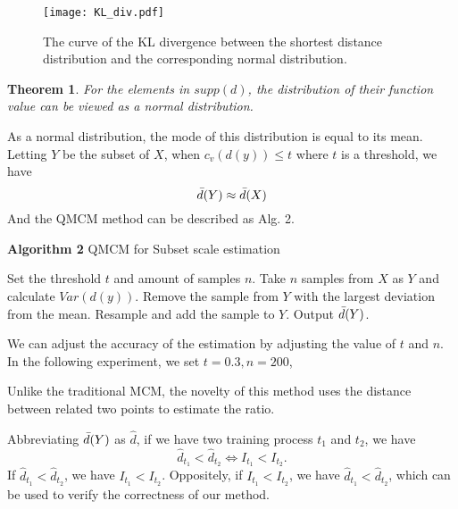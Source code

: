\documentclass[letterpaper]{article} %
\newtheorem{theorem}{Theorem}
\begin{document}
\begin{figure}[p]
    \centering
    \texttt{[image: KL\_div.pdf]}
    \caption{The curve of the KL divergence between the shortest distance distribution and the corresponding normal distribution.}
    \label{KL_curve}
\end{figure}

\begin{theorem}
    For the elements in $supp(d)$, the distribution of their function value can be viewed as a normal distribution.
    \label{support_distance_theorom}
\end{theorem}

As a normal distribution, the mode of this distribution is equal to its mean. Letting $Y$ be the subset of $X$, when $c_v(d(y)) \leq t$ where $t$ is a threshold, we have
\begin{equation*}
    \Bar{d}(Y) \approx \Bar{d}(X)
\end{equation*}
And the QMCM method can be described as Alg. 2.

\begin{algorithm}[htbp]
\caption*{\textbf{Algorithm 2} QMCM for Subset scale estimation}
\begin{algorithmic}[1]
    \STATE Set the threshold $t$ and amount of samples $n$.
    \STATE Take $n$ samples from $X$ as $Y$ and calculate $Var(d(y))$.
    \STATE Remove the sample from $Y$ with the largest deviation from the mean.
    \STATE Resample and add the sample to $Y$.
    \ENDWHILE
    \STATE Output $\Bar{d}(Y)$.
\end{algorithmic}
\end{algorithm}
We can adjust the accuracy of the estimation by adjusting the value of $t$ and $n$. In the following experiment, we set $t = 0.3, n = 200$,

Unlike the traditional MCM, the novelty of this method uses the distance between related two points to estimate the ratio.

Abbreviating $\Bar{d}(Y)$ as $\hat{d}$, if we have two training process $t_1$ and $t_2$, we have
\begin{equation}
    \hat{d}_{t_1} < \hat{d}_{t_2} \Leftrightarrow I_{t_1} < I_{t_2}.
    \label{information_comparing}
\end{equation}
If $ \hat{d}_{t_1} < \hat{d}_{t_2}$, we have $I_{t_1} < I_{t_2}$. Oppositely, if $I_{t_1} < I_{t_2}$, we have $\hat{d}_{t_1} < \hat{d}_{t_2}$, which can be used to verify the correctness of our method.
\end{document}
